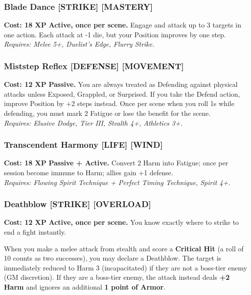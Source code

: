 {\subsubsection*{Blade Dance \textnormal{[STRIKE] [MASTERY]}}
\label{talent:blade-dance}
\textbf{Cost: 18 XP} \textbf{Active, once per scene.} Engage and attack up to 3 targets in one action. Each attack at -1 die, but your Position improves by one step. \\
\textit{Requires: Melee 5+, Duelist's Edge, Flurry Strike.}

\subsubsection*{Miststep Reflex \textnormal{[DEFENSE] [MOVEMENT]}}
\label{talent:miststep-reflex}
\textbf{Cost: 12 XP} \textbf{Passive.} You are always treated as Defending against physical attacks unless Exposed, Grappled, or Surprised. If you take the Defend action, improve Position by +2 steps instead. Once per scene when you roll 1s while defending, you must mark 2 Fatigue or lose the benefit for the scene. \\
\textit{Requires: Elusive Dodge, Tier III, Stealth 4+, Athletics 3+.}

\subsubsection*{Transcendent Harmony \textnormal{[LIFE] [WIND]}}
\label{talent:transcendent-harmony}
\textbf{Cost: 18 XP} \textbf{Passive + Active.} Convert 2 Harm into Fatigue; once per session become immune to Harm; allies gain +1 defense. \\
\textit{Requires: Flowing Spirit Technique + Perfect Timing Technique, Spirit 4+.}

\subsubsection*{Deathblow \textnormal{[STRIKE] [OVERLOAD]}}
\label{talent:deathblow}
\textbf{Cost: 12 XP} \textbf{Active, once per scene.} You know exactly where to strike to end a fight instantly.

When you make a melee attack from stealth and score a \textbf{Critical Hit} (a roll of 10 counts as two successes), you may declare a Deathblow. The target is immediately reduced to Harm 3 (incapacitated) if they are not a boss-tier enemy (GM discretion). If they are a boss-tier enemy, the attack instead deals \textbf{+2 Harm} and ignores an additional \textbf{1 point of Armor}.

}
